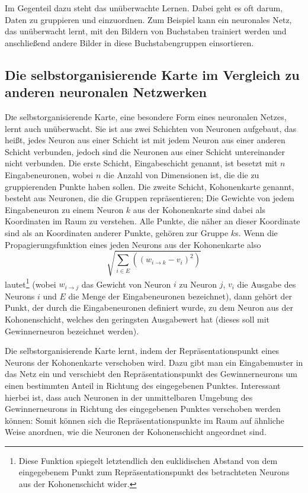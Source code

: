 \documentclass[twoside,a4paper,draft]{article}
\newcommand{\commonlettrine}[1]{\lettrine[nindent=0em,lines=2]{#1}}
\begin{document}
Im Gegenteil dazu steht das unüberwachte Lernen. Dabei geht es oft darum, Daten zu gruppieren und einzuordnen. Zum Beispiel kann ein neuronales Netz, das unüberwacht lernt, mit den Bildern von Buchstaben trainiert werden und anschließend andere Bilder in diese Buchstabengruppen einsortieren.

\subsection{Die selbstorganisierende Karte im Vergleich zu anderen neuronalen Netzwerken}

\commonlettrine{D}ie selbstorganisierende Karte, eine besondere Form eines neuronalen Netzes, lernt auch unüberwacht. Sie ist aus zwei Schichten von Neuronen aufgebaut, das heißt, jedes Neuron aus einer Schicht ist mit jedem Neuron aus einer anderen Schicht verbunden, jedoch sind die Neuronen aus einer Schicht untereinander nicht verbunden. Die erste Schicht, Eingabeschicht genannt, ist besetzt mit \(n\) Eingabeneuronen, wobei \(n\) die Anzahl von Dimensionen ist, die die zu gruppierenden Punkte haben sollen. Die zweite Schicht, Kohonenkarte genannt, besteht aus Neuronen, die die Gruppen repräsentieren; Die Gewichte von jedem Eingabeneuron zu einem Neuron \(k\) aus der Kohonenkarte sind dabei als Koordinaten im Raum zu verstehen. Alle Punkte, die näher an dieser Koordinate sind als an Koordinaten anderer Punkte, gehören zur Gruppe \(k\)s. Wenn die Propagierungsfunktion eines jeden Neurons aus der Kohonenkarte also
\[
\sqrt{\sum_{i\in{}E} \left((w_{i\rightarrow{}k} - v_i)^2\right)}
\]
lautet\footnote{Diese Funktion spiegelt letztendlich den euklidischen Abstand von dem eingegebenem Punkt zum Repräsentationspunkt des betrachteten Neurons aus der Kohonenschicht wider.} (wobei \(w_{i\rightarrow{}j}\) das Gewicht von Neuron \(i\) zu Neuron \(j\), \(v_i\) die Ausgabe des Neurons \(i\) und \(E\) die Menge der Eingabeneuronen bezeichnet), dann gehört der Punkt, der durch die Eingabeneuronen definiert wurde, zu dem Neuron aus der Kohonenschicht, welches den geringsten Ausgabewert hat (dieses soll mit \glqq{}Gewinnerneuron\grqq{} bezeichnet werden).

Die selbstorganisierende Karte lernt, indem der Repräsentationspunkt eines Neurons der Kohonenkarte verschoben wird. Dazu gibt man ein Eingabemuster in das Netz ein und verschiebt den Repräsentationspunkt des Gewinnerneurons um einen bestimmten Anteil in Richtung des eingegebenen Punktes. Interessant hierbei ist, dass auch Neuronen in der unmittelbaren Umgebung des Gewinnerneurons in Richtung des eingegebenen Punktes verschoben werden können: Somit können sich die Repräsentationspunkte im Raum auf ähnliche Weise anordnen, wie die Neuronen der Kohonenschicht angeordnet sind.
\end{document}
